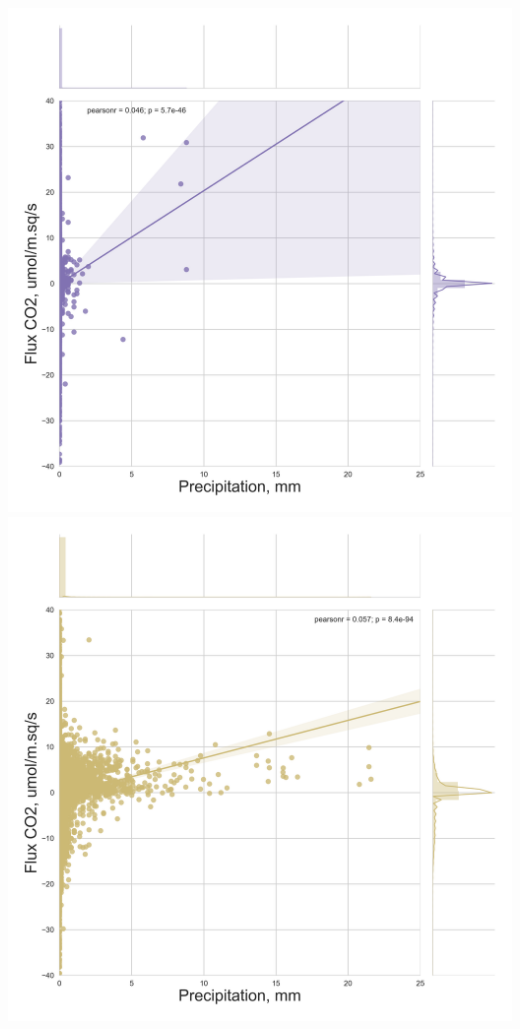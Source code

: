 \documentclass{beamer}
\begin{document}
\begin{frame}
\begin{columns}[t]
\centering
\includegraphics[width=\textwidth]{FvsP/US-FPe.png}\\
\includegraphics[width=\textwidth]{FvsP/US-Los.png}
\end{columns}

\end{frame}
\end{document}
